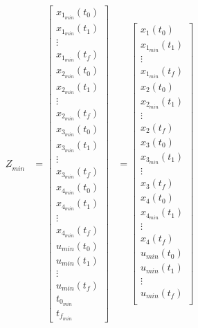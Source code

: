 \documentclass[11pt,usenames]{article}
\begin{document}
	\begin{align}
	\underbar Z_{min} &= 
	\begin{bmatrix}
	x_{1_{min}}(t_{0}) \\ x_{1_{min}}(t_{1}) \\  \vdots \\  x_{1_{min}}(t_{f}) \\  
	x_{2_{min}}(t_{0}) \\ x_{2_{min}}(t_{1}) \\ \vdots \\  x_{2_{min}}(t_{f}) \\ 
	x_{3_{min}}(t_{0}) \\ x_{3_{min}}(t_{1}) \\ \vdots \\  x_{3_{min}}(t_{f}) \\ 
	x_{4_{min}}(t_{0}) \\ x_{4_{min}}(t_{1}) \\ \vdots \\  x_{4_{min}}(t_{f}) \\ 
	u_{min}(t_{0}) \\ u_{min}(t_{1}) \\ \vdots \\  u_{min}(t_{f}) \\ 
	t_{0_{min}} \\ 
	t_{f_{min}}  
	\end{bmatrix}
	&=
	\begin{bmatrix}
	x_{1}(t_{0}) \\ x_{1_{min}}(t_{1}) \\ \vdots \\  x_{1_{min}}(t_{f}) \\  
	x_{2}(t_{0}) \\ x_{2_{min}}(t_{1}) \\ \vdots \\  x_{2}(t_{f}) \\ 
	x_{3}(t_{0}) \\ x_{3_{min}}(t_{1}) \\ \vdots \\  x_{3}(t_{f}) \\ 
	x_{4}(t_{0}) \\ x_{4_{min}}(t_{1}) \\ \vdots \\  x_{4}(t_{f}) \\ 
	u_{min}(t_{0}) \\ u_{min}(t_{1}) \\ \vdots \\  u_{min}(t_{f}) \\ 

\end{bmatrix}
\end{align}
\end{document}
